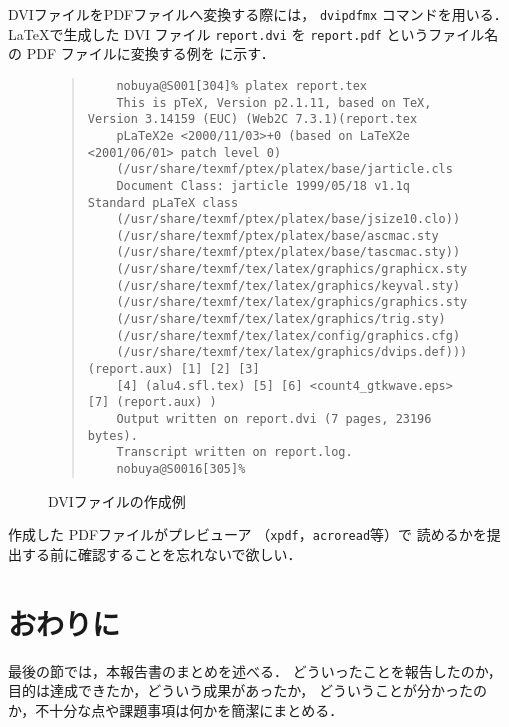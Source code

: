 \documentclass{ujarticle}[11pt]
\newcommand{\figref}[1]{\makebox{図~\ref{#1}}}
\begin{document}
    DVIファイルをPDFファイルへ変換する際には，
    \verb|dvipdfmx| コマンドを用いる．
    \LaTeX で生成した DVI ファイル \verb|report.dvi| を
    \verb|report.pdf| というファイル名の PDF ファイルに変換する例を
    \figref{fig:DVIファイルの作成例}に示す．
    \begin{figure}[htb]
    {\small
    \begin{quote}
    \begin{verbatim}
    nobuya@S001[304]% platex report.tex
    This is pTeX, Version p2.1.11, based on TeX, Version 3.14159 (EUC) (Web2C 7.3.1)(report.tex
    pLaTeX2e <2000/11/03>+0 (based on LaTeX2e <2001/06/01> patch level 0)
    (/usr/share/texmf/ptex/platex/base/jarticle.cls
    Document Class: jarticle 1999/05/18 v1.1q Standard pLaTeX class
    (/usr/share/texmf/ptex/platex/base/jsize10.clo))
    (/usr/share/texmf/ptex/platex/base/ascmac.sty
    (/usr/share/texmf/ptex/platex/base/tascmac.sty))
    (/usr/share/texmf/tex/latex/graphics/graphicx.sty
    (/usr/share/texmf/tex/latex/graphics/keyval.sty)
    (/usr/share/texmf/tex/latex/graphics/graphics.sty
    (/usr/share/texmf/tex/latex/graphics/trig.sty)
    (/usr/share/texmf/tex/latex/config/graphics.cfg)
    (/usr/share/texmf/tex/latex/graphics/dvips.def))) (report.aux) [1] [2] [3]
    [4] (alu4.sfl.tex) [5] [6] <count4_gtkwave.eps> [7] (report.aux) )
    Output written on report.dvi (7 pages, 23196 bytes).
    Transcript written on report.log.
    nobuya@S0016[305]%
    \end{verbatim}
    \end{quote}
    } %
    \caption{DVIファイルの作成例}
    \label{fig:DVIファイルの作成例}
    \end{figure}
    作成した PDFファイルがプレビューア （\verb|xpdf|，\verb|acroread|等）で
    読めるかを提出する前に確認することを忘れないで欲しい．
     
     
    \section{おわりに}
    \label{sec:おわりに}
    最後の節では，本報告書のまとめを述べる．
    どういったことを報告したのか，目的は達成できたか，どういう成果があったか，
    どういうことが分かったのか，不十分な点や課題事項は何かを簡潔にまとめる．
     
\end{document}
